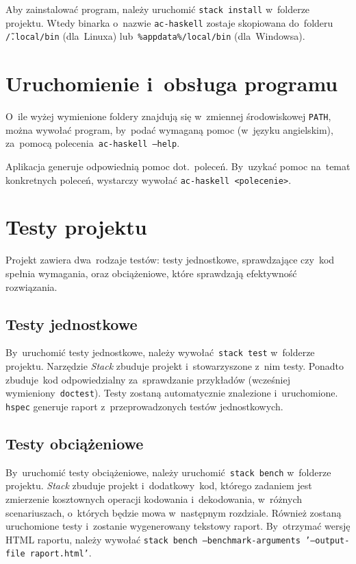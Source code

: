 \documentclass[../../praca.tex]{subfiles}
\begin{document}
Aby zainstalować program, należy uruchomić \texttt{stack install} 
w~folderze projektu. Wtedy binarka o~nazwie \texttt{ac-haskell}
zostaje skopiowana do~folderu \texttt{\~/.local/bin} (dla~Linuxa)
lub~\texttt{\%appdata\%/local/bin} (dla~Windowsa).

\section{Uruchomienie i~obsługa programu}

O~ile wyżej wymienione foldery znajdują się w~zmiennej środowiskowej
\texttt{PATH}, można wywołać program, by~podać wymaganą pomoc (w~języku angielskim),
za~pomocą polecenia~\texttt{ac-haskell --help}.

Aplikacja generuje odpowiednią pomoc dot.~poleceń. By~uzykać pomoc na~temat konkretnych
poleceń, wystarczy wywołać \texttt{ac-haskell <polecenie>}.

\section{Testy projektu}

Projekt zawiera dwa~rodzaje testów: testy jednostkowe, sprawdzające
czy~kod spełnia wymagania, oraz obciążeniowe, które sprawdzają
efektywność rozwiązania.

\subsection{Testy jednostkowe}

By~uruchomić testy jednostkowe, należy wywołać~\texttt{stack test}
w~folderze projektu. Narzędzie \emph{Stack} zbuduje projekt
i~stowarzyszone z~nim testy. Ponadto zbuduje~kod
odpowiedzialny za~sprawdzanie przykładów (wcześniej
wymieniony~\texttt{doctest}). Testy zostaną automatycznie
znalezione i~uruchomione. \texttt{hspec} 
generuje raport z~przeprowadzonych testów jednostkowych.

\subsection{Testy obciążeniowe}

By~uruchomić testy obciążeniowe, należy uruchomić~\texttt{stack bench}
w~folderze projektu. \emph{Stack} zbuduje projekt
i~dodatkowy~kod, którego zadaniem jest zmierzenie
kosztownych operacji kodowania i~dekodowania,
w~różnych scenariuszach, o~których będzie mowa
w~następnym rozdziale. Również zostaną uruchomione
testy i~zostanie wygenerowany tekstowy raport. 
By~otrzymać wersję HTML raportu, należy wywołać
\texttt{stack bench --benchmark-arguments '--output-file raport.html'}.
\end{document}
